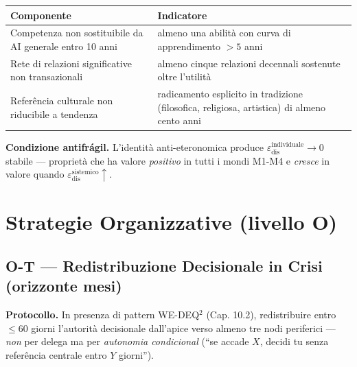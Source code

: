 {\def\LTcaptype{none} %
{\small\begin{longtable}[]{@{}
  >{\raggedright\arraybackslash}p{}
  >{\raggedright\arraybackslash}p{}@{}}
\toprule\noalign{}
\begin{minipage}[b]{\linewidth}\raggedright
Componente
\end{minipage} & \begin{minipage}[b]{\linewidth}\raggedright
Indicatore
\end{minipage} \\
\midrule\noalign{}
\endhead
\bottomrule\noalign{}
\endlastfoot
Competenza non sostituibile da AI generale entro 10 anni & almeno una
abilità con curva di apprendimento \(> 5\) anni \\
Rete di relazioni significative non transazionali & almeno cinque
relazioni decennali sostenute oltre l'utilità \\
Referência culturale non riducibile a tendenza & radicamento esplicito
in tradizione (filosofica, religiosa, artistica) di almeno cento anni \\
\end{longtable}}
}

\Proved{} \textbf{Condizione antifrágil.} L'identità anti-eteronomica
produce \(\varepsilon_{\text{dis}}^{\text{individuale}} \to 0\) stabile
--- proprietà che ha valore \emph{positivo} in tutti i mondi M1-M4 e
\emph{cresce} in valore quando
\(\varepsilon_{\text{dis}}^{\text{sistemico}} \uparrow\).



\section{Strategie Organizzative (livello
O)}\label{strategie-organizzative-livello-o}

\subsection{O-T --- Redistribuzione Decisionale in Crisi (orizzonte
mesi)}\label{o-t-redistribuzione-decisionale-in-crisi-orizzonte-mesi}

\Hypoth{} \textbf{Protocollo.} In presenza di pattern WE-DEQ$^2$ (Cap.
10.2), redistribuire entro \(\leq 60\) giorni l'autorità decisionale
dall'apice verso almeno tre nodi periferici --- \emph{non} per delega ma
per \emph{autonomia condicional} (``se accade \(X\), decidi tu senza
referência centrale entro \(Y\) giorni'').

